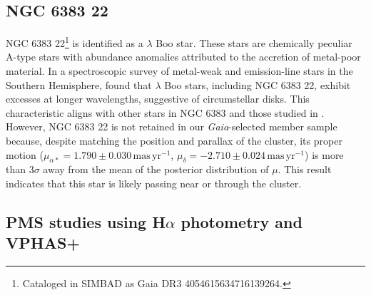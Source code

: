 \documentclass{aa}
\begin{document}
\subsection{NGC 6383 22}
NGC 6383 22\footnote{Cataloged in SIMBAD as Gaia DR3 4054615634716139264.} is identified as a $\lambda$ Boo star. These stars are chemically peculiar A-type stars with abundance anomalies attributed to the accretion of metal-poor material. In a spectroscopic survey of metal-weak and emission-line stars in the Southern Hemisphere, \citet{2020MNRAS.499.2701M} found that $\lambda$ Boo stars, including NGC 6383 22, exhibit excesses at longer wavelengths, suggestive of circumstellar disks. This characteristic aligns with other stars in NGC 6383 and those studied in \citet{2019MNRAS.484.5102K}. However, NGC 6383 22 is not retained in our \textit{Gaia}-selected member sample because, despite matching the position and parallax of the cluster, its proper motion ($\mu_{\alpha*} = 1.790 \pm 0.030\,\mathrm{mas\,yr^{-1}}$, $\mu_{\delta} = -2.710 \pm 0.024\,\mathrm{mas\,yr^{-1}}$) is more than $3\sigma$ away from the mean of the posterior distribution of $\mu$. This result indicates that this star is likely passing near or through the cluster.

\subsection{PMS studies using \texorpdfstring{H$\alpha$}{H-alpha} photometry and VPHAS+}
\end{document}
